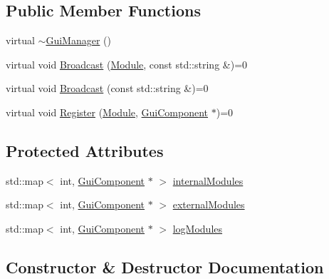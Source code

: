 \subsection*{Public Member Functions}
\begin{DoxyCompactItemize}
\item 
virtual \mbox{\hyperlink{class_gui_manager_ad3cad0a319d9fa745cea5ab8e511b4ac}{$\sim$\+Gui\+Manager}} ()
\item 
virtual void \mbox{\hyperlink{class_gui_manager_a32754b1f01775df580985ee9e6318a2f}{Broadcast}} (\mbox{\hyperlink{_mediator_2_mediator_2_commons_8h_a88683b64d84542943724ba0f211153af}{Module}}, const std\+::string \&)=0
\item 
virtual void \mbox{\hyperlink{class_gui_manager_a062c8b90e738509c1679c1fe50b1dddc}{Broadcast}} (const std\+::string \&)=0
\item 
virtual void \mbox{\hyperlink{class_gui_manager_acad986a245ce983ac46d0f1f38107c56}{Register}} (\mbox{\hyperlink{_mediator_2_mediator_2_commons_8h_a88683b64d84542943724ba0f211153af}{Module}}, \mbox{\hyperlink{class_gui_component}{Gui\+Component}} $\ast$)=0
\end{DoxyCompactItemize}
\subsection*{Protected Attributes}
\begin{DoxyCompactItemize}
\item 
std\+::map$<$ int, \mbox{\hyperlink{class_gui_component}{Gui\+Component}} $\ast$ $>$ \mbox{\hyperlink{class_gui_manager_ad980176ae4a013e537866439a440ba6a}{internal\+Modules}}
\item 
std\+::map$<$ int, \mbox{\hyperlink{class_gui_component}{Gui\+Component}} $\ast$ $>$ \mbox{\hyperlink{class_gui_manager_aff0931acdb10aefb4425e0ecd8061b43}{external\+Modules}}
\item 
std\+::map$<$ int, \mbox{\hyperlink{class_gui_component}{Gui\+Component}} $\ast$ $>$ \mbox{\hyperlink{class_gui_manager_a949c60936bbbdc463ac190dcec53d173}{log\+Modules}}
\end{DoxyCompactItemize}


\subsection{Constructor \& Destructor Documentation}
\mbox{\label{class_gui_manager_ad3cad0a319d9fa745cea5ab8e511b4ac}} 
